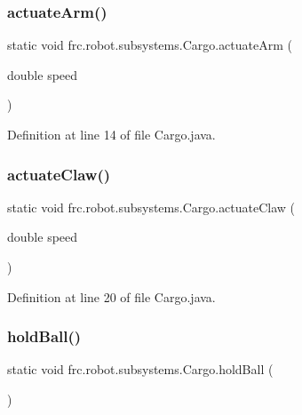 \subsubsection{\texorpdfstring{actuate\+Arm()}{actuateArm()}}
{\footnotesize\ttfamily static void frc.\+robot.\+subsystems.\+Cargo.\+actuate\+Arm (\begin{DoxyParamCaption}\item[{double}]{speed }\end{DoxyParamCaption})\hspace{0.3cm}{\ttfamily [static]}}



Definition at line 14 of file Cargo.\+java.

\mbox{\label{classfrc_1_1robot_1_1subsystems_1_1Cargo_aa05df516e815067a7b853d9fbdc35f01}} 
\subsubsection{\texorpdfstring{actuate\+Claw()}{actuateClaw()}}
{\footnotesize\ttfamily static void frc.\+robot.\+subsystems.\+Cargo.\+actuate\+Claw (\begin{DoxyParamCaption}\item[{double}]{speed }\end{DoxyParamCaption})\hspace{0.3cm}{\ttfamily [static]}}



Definition at line 20 of file Cargo.\+java.

\mbox{\label{classfrc_1_1robot_1_1subsystems_1_1Cargo_a8a4dd09c62967c4d82af8953cf8ab731}} 
\subsubsection{\texorpdfstring{hold\+Ball()}{holdBall()}}
{\footnotesize\ttfamily static void frc.\+robot.\+subsystems.\+Cargo.\+hold\+Ball (\begin{DoxyParamCaption}{ }\end{DoxyParamCaption})\hspace{0.3cm}{\ttfamily [static]}}



